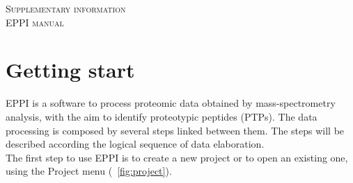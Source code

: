 \documentclass[a4paper,14pt]{extarticle}
\begin{document}
%
\begin{titlepage}
\begin{center}
\textsc{\LARGE Supplementary information}\\[3cm]
\textsc{\huge  EPPI manual}\\[1.5cm]
\end{center}
\end{titlepage}

\section{Getting start}
EPPI is a software to process proteomic data obtained by mass-spectrometry analysis, with the aim to identify proteotypic peptides (PTPs). The data processing is composed by several steps linked between them. The steps will be described according the logical sequence of data elaboration.\\
The first step to use EPPI is to create a new project or to open an existing one, using the Project menu (\figurename~\ref{fig:project}).
\end{document}
